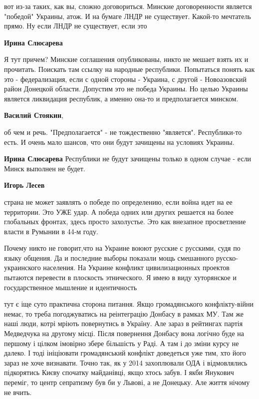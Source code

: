 \begin{itemize}
\begin{itemize}
вот из-за таких, как вы, сложно договориться. Минские договоренности является
"победой" Украины, атож. И на бумаге ЛНДР не существует. Какой-то мечтатель
прямо. Ну если ЛНДР не существует, если это

\textbf{Ирина Слюсарева} 

Я тут причем? Минские соглашения опубликованы, никто не мешает взять их и
прочитать. Поискать там ссылку на народные республики. Попытаться понять как
это - федерализация, если с одной стороны - Украина, с другой - Новоазовский
район Донецкой области. Допустим это не победа Украины. Но целью Украины
является ликвидация республик, а именно она-то и предполагается минском.

\textbf{Василий Стоякин}, 

об чем и речь. "Предполагается" - не тождественно "является". Республики-то
есть. И очень мало шансов, что они будут зачищены на условиях Украины.

\textbf{Ирина Слюсарева} Республики не будут зачищены только в одном случае - если Минск выполнен не будет.

\textbf{Игорь Лесев} 

страна не может заявлять о победе по определению, если война идет на ее
территории. Это УЖЕ удар. А победа одних или других решается на более
глобальных фронтах, здесь просто захолустье. Это как внезапное просветление
власти в Румынии в 44-м году.

\end{itemize} %


Почему никто не говорит,что на Украине воюют русские с русскими, судя по языку
общения. Да и последние выборы показали мощь смешанного русско-украинского
населения. На Украине конфликт цивилизационных проектов пытаются перевести в
плоскость этнического. Я имею в виду хуторянское и государственное мышление и
идентичность



тут є іще суто практична сторона питання. Якщо громадянського конфлікту-війни
немає, то треба погоджуватись на реінтеграцію Донбасу в рамках МУ. Там же наші
люди, котрі мріють повернутись в Україну. Але зараз в рейтингах партія
Медведчука на другому місці. Після повернення Донбасу вона логічно буде на
першому і цілком імовірно збере більшість у Раді. А там і до зміни курсу не
далеко. І тоді ініціювати громадянський конфлікт доведеться уже тим, хто його
зараз не хоче визнавати. Точно так, як у 2014 захоплювали ОДА і відмовлялись
підкорятись Києву спочатку майданівці, якщо хтось забув. І якби Янукович
переміг, то центр сепратизму був би у Львові, а не Донецьку. Але життя нічому
не вчить.


\end{itemize}
